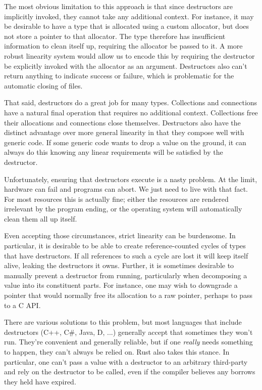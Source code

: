 The most obvious limitation to this approach is that since destructors are implicitly invoked,
they cannot take any additional context. For instance, it may be desirable
to have a type that is allocated using a custom allocator, but does not store
a pointer to that allocator. The type therefore has insufficient information
to clean itself up, requiring the allocator be passed to it. A more robust linearity
system would allow us to encode this by requiring the destructor be explicitly invoked with
the allocator as an argument. Destructors also can't return anything to indicate
success or failure, which is problematic for the automatic closing of files.

That said, destructors do a great job for many types. Collections and connections
have a natural final operation that requires no additional context.
Collections free their allocations and connections close themselves.
Destructors also have the distinct advantage over more general linearity in that
they compose well with generic code. If some generic code wants to drop a value
on the ground, it can always do this knowing any linear requirements will be
satisfied by the destructor.

Unfortunately, ensuring that destructors execute is a nasty problem.
At the limit, hardware can fail and programs can abort. We just need to live
with that fact. For most resources this is actually fine; either the resources are
rendered irrelevant by the program ending, or the operating system will automatically
clean them all up itself.

Even accepting those circumstances, strict
linearity can be burdensome. In particular, it is desirable to be able to
create reference-counted cycles of types that have destructors. If all references to
such a cycle are lost it will keep itself alive, leaking the destructors it
owns. Further, it is sometimes desirable to manually prevent a destructor
from running, particularly when decomposing a value into its constituent parts. For
instance, one may wish to downgrade a pointer that would normally free its allocation
to a raw pointer, perhaps to pass to a C API.

There are various solutions to this problem, but most languages that include
destructors (C++, C\#, Java, D, ...) generally accept that sometimes
they won't run. They're convenient and generally
reliable, but if one \emph{really} needs something to happen, they can't always be
relied on. Rust also takes this stance. In particular, one can't pass a value with
a destructor to an arbitrary third-party and rely on the destructor to be called,
even if the compiler believes any borrows they held have expired.


